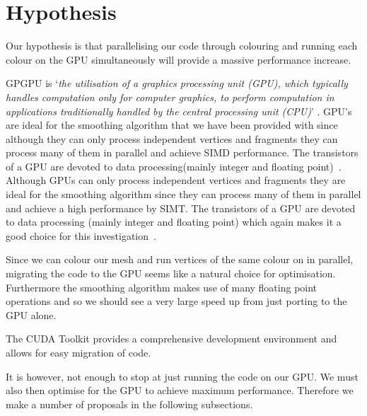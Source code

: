 \section{Hypothesis}
Our hypothesis is that parallelising our code through colouring and running each colour on the GPU simultaneously will provide a massive performance increase.


GPGPU is `\emph{the utilisation of a graphics processing unit (GPU), which typically handles computation only for computer graphics, to perform computation in applications traditionally handled by the central processing unit (CPU)}' \cite{gpgpu}.
GPU's are ideal for the smoothing algorithm that we have been provided with since although they can only process independent vertices and fragments they can process many of them in parallel and achieve SIMD performance. The transistors of a GPU are devoted to data processing(mainly integer and floating point)~\cite{lec7}.
Although GPUs can only process independent vertices and fragments they are ideal for the smoothing algorithm since they can process many of them in parallel and achieve a high performance by SIMT. The transistors of a GPU are devoted to data processing (mainly integer and floating point) which again makes it a good choice for this investigation~\cite{lec7}.


Since we can colour our mesh and run vertices of the same colour on in parallel, migrating the code to the GPU seems like a natural choice for optimisation. Furthermore the smoothing algorithm makes use of many floating point operations and so we should see a very large speed up from just porting to the GPU alone.

The CUDA Toolkit provides a comprehensive development environment and allows for easy migration of code.




It is however, not enough to stop at just running the code on our GPU. We must also then optimise for the GPU to achieve maximum performance. Therefore we make a number of proposals in the following subsections.




